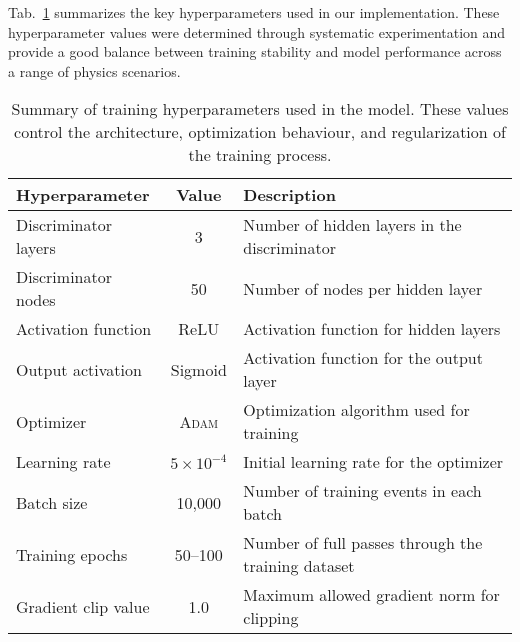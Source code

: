         Tab.~\ref{tab:moment-unfolding-hyperparams} summarizes the key hyperparameters used in our implementation.
        These hyperparameter values were determined through systematic experimentation and provide a good balance between training stability and model performance across a range of physics scenarios.

\begin{table}
\centering
\begin{tabular}{|l|c|p{8cm}|}
\hline
\textbf{Hyperparameter} & \textbf{Value} & \textbf{Description} \\
\hline
Discriminator layers     & 3             & Number of hidden layers in the discriminator \\
Discriminator nodes      & 50            & Number of nodes per hidden layer \\
Activation function      & ReLU          & Activation function for hidden layers \\
Output activation        & Sigmoid       & Activation function for the output layer \\
Optimizer                & \textsc{Adam}          & Optimization algorithm used for training \\
Learning rate            & $5 \times 10^{-4}$ & Initial learning rate for the optimizer \\
Batch size              & 10,000        & Number of training events in each batch \\
Training epochs          & 50--100       & Number of full passes through the training dataset \\
Gradient clip value      & 1.0           & Maximum allowed gradient norm for clipping \\
\hline
\end{tabular}
\caption{Summary of training hyperparameters used in the model.
%
These values control the architecture, optimization behaviour, and regularization of the training process.}
\label{tab:moment-unfolding-hyperparams}
\end{table}

